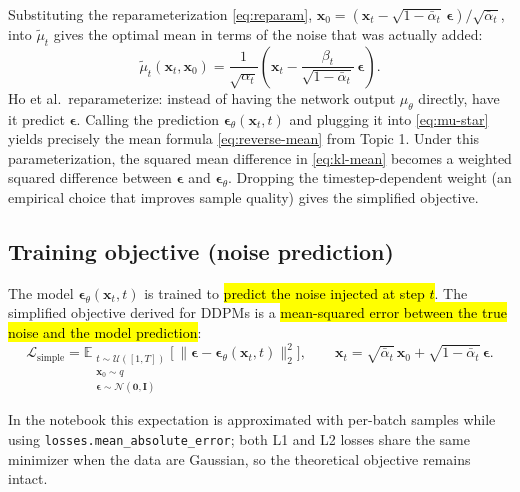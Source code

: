 \documentclass[11pt]{article}
\theoremstyle{remark}
\begin{document}
Substituting the reparameterization \eqref{eq:reparam}, $\mathbf{x}_0 = (\mathbf{x}_t - \sqrt{1-\bar{\alpha}_t}\,\boldsymbol{\epsilon})/\sqrt{\bar{\alpha}_t}$, into $\tilde{\mu}_t$ gives the optimal mean in terms of the noise that was actually added:
\begin{equation}
\tilde{\mu}_t(\mathbf{x}_t,\mathbf{x}_0) = \frac{1}{\sqrt{\alpha_t}}\!\left(\mathbf{x}_t - \frac{\beta_t}{\sqrt{1-\bar{\alpha}_t}}\,\boldsymbol{\epsilon}\right).
\label{eq:mu-star}
\end{equation}
Ho et al.\ reparameterize: instead of having the network output $\mu_\theta$ directly, have it predict $\boldsymbol{\epsilon}$. Calling the prediction $\boldsymbol{\epsilon}_\theta(\mathbf{x}_t, t)$ and plugging it into \eqref{eq:mu-star} yields precisely the mean formula \eqref{eq:reverse-mean} from Topic 1. Under this parameterization, the squared mean difference in \eqref{eq:kl-mean} becomes a weighted squared difference between $\boldsymbol{\epsilon}$ and $\boldsymbol{\epsilon}_\theta$. Dropping the timestep-dependent weight (an empirical choice that improves sample quality) gives the simplified objective.

\subsection{Training objective (noise prediction)}

The model $\boldsymbol{\epsilon}_\theta(\mathbf{x}_t, t)$ is trained to \hl{predict the noise injected at step $t$}. The simplified objective derived for DDPMs is a \hl{mean-squared error between the true noise and the model prediction}:
\begin{equation}
\mathcal{L}_{\text{simple}} = \mathbb{E}_{\substack{t \sim \mathcal{U}([1, T]) \\ \mathbf{x}_0 \sim q \\ \boldsymbol{\epsilon} \sim \mathcal{N}(\mathbf{0}, \mathbf{I})}} \!\Big[\,\lVert \boldsymbol{\epsilon} - \boldsymbol{\epsilon}_\theta(\mathbf{x}_t, t) \rVert_2^2 \Big],
\qquad
\mathbf{x}_t = \sqrt{\bar{\alpha}_t}\,\mathbf{x}_0 + \sqrt{1-\bar{\alpha}_t}\,\boldsymbol{\epsilon}.
\label{eq:lsimple}
\end{equation}

In the notebook this expectation is approximated with per-batch samples while using \texttt{losses.mean\_absolute\_error}; both L1 and L2 losses share the same minimizer when the data are Gaussian, so the theoretical objective remains intact.
\end{document}
